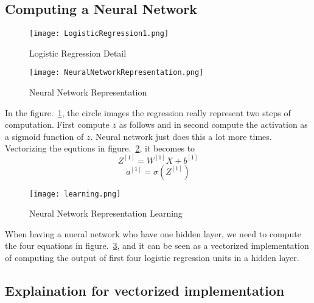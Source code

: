 \documentclass[a4paper]{article}
\begin{document}
\subsection{Computing a Neural Network}

\begin{figure}[!htp]
\begin{center}
   \texttt{[image: LogisticRegression1.png]}
\end{center}
   \caption{Logistic Regression Detail~\cite{mooc.com,Coursera.org}}
\label{fig:detail}
\end{figure}

\begin{figure}[!htp]
\begin{center}
   \texttt{[image: NeuralNetworkRepresentation.png]}
\end{center}
   \caption{Neural Network Representation~\cite{mooc.com,Coursera.org}}
\label{fig:Representation}
\end{figure}

In the figure.~\ref{fig:detail}, the circle images the regression really represent two steps of computation. First compute $z$ as follows and in second compute the activation as a sigmoid function of $z$. Neural network just does this a lot more times. Vectorizing the equtions in figure.~\ref{fig:Representation}, it becomes to 
\begin{equation}
Z^{[1]}=W^{[1]}X+b^{[1]}
\end{equation}
\begin{equation}
a^{[1]}=\sigma(Z^{[1]})
\end{equation}

\begin{figure}[!htp]
\begin{center}
   \texttt{[image: learning.png]}
\end{center}
   \caption{Neural Network Representation Learning~\cite{mooc.com,Coursera.org}}
\label{fig:learning}
\end{figure}

When having a nueral network who have one hidden layer, we need to compute the four equations in figure.~\ref{fig:learning}, and it can be seen as a vectorized implementation of computing the output of first four logistic regression units in a hidden layer.


\subsection{Explaination for vectorized implementation}
\end{document}
